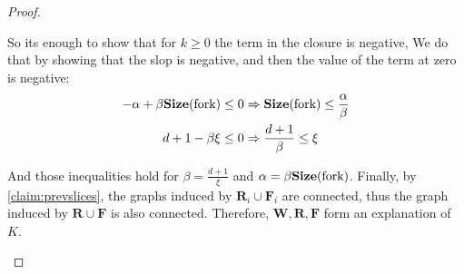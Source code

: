 \begin{proof}
\begin{enumerate}
\begin{enumerate}
\begin{equation*}
            \end{equation*}
            So its enough to show that for $k\ge 0$ the term in the closure is negative, We do that by showing that the slop is negative, and then the value of the term at zero is negative: 
            \begin{equation*}
              \begin{split}
                  - \alpha  +  \beta \mathbf{Size}(\text{fork}) \le 0 & \Rightarrow   \mathbf{Size}(\text{fork}) \le \frac{\alpha}{\beta} \\ 
                 d + 1  -\beta \xi \le 0 & \Rightarrow \frac{d+1}{\beta} \le \xi
              \end{split}
            \end{equation*}
        \end{enumerate}
        And those inequalities hold for $\beta = \frac{d+1}{\xi}$ and $\alpha = \beta \mathbf{Size}(\text{fork})$. Finally, by \cref{claim:prevslices}, the graphs induced by $\mathbf{R}_{i} \cup \mathbf{F}_{i}$ are connected, thus the graph induced by $\mathbf{R}\cup \mathbf{F}$ is also connected. Therefore, $\mathbf{W}, \mathbf{R}, \mathbf{F}$ form an explanation of $K$. 
    \end{enumerate}

  \end{proof}

